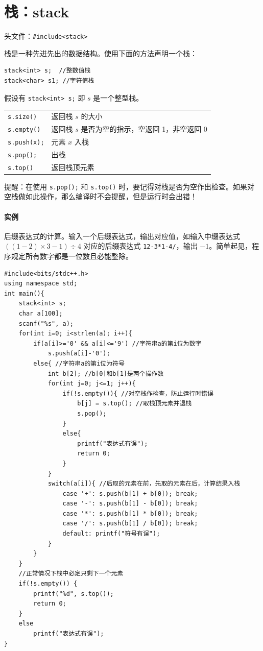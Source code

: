 \documentclass[UTF8]{ctexart}
\newcommand\Emph[1]{\colorbox{green!10}{\textcolor{green!30!black}{#1}}}
\begin{document}
\section{栈：stack}
头文件：\verb!#include<stack>!

栈是一种先进先出的数据结构。使用下面的方法声明一个栈：
\begin{lstlisting}[numbers=none]
stack<int> s;  //整数值栈
stack<char> s1; //字符值栈
\end{lstlisting}

假设有 \verb!stack<int> s;! 即 $s$ 是一个整型栈。 
\begin{table}[H]
  \centering
  \begin{tabular}{ll}
    \verb!s.size()! & 返回栈 $s$ 的大小 \\
    \verb!s.empty()! & 返回栈 $s$ 是否为空的指示，空返回 1，非空返回 0 \\
    \verb!s.push(x);! & 元素 $x$ 入栈 \\
    \verb!s.pop();! & 出栈 \\
    \verb!s.top()! & 返回栈顶元素 \\
  \end{tabular}
\end{table}

提醒：在使用 \verb!s.pop();! 和 \verb!s.top()! 时，要记得\Emph{对栈是否为空作出检查}。如果对空栈做如此操作，那么编译时不会提醒，但是运行时会出错！

\paragraph{实例} 后缀表达式的计算。输入一个后缀表达式，输出对应值，如输入中缀表达式 $((1-2)\times 3-1)\div 4$ 对应的后缀表达式 \verb!12-3*1-4/!，输出 $-1$。简单起见，程序规定所有数字都是一位数且必能整除。

\begin{lstlisting}
#include<bits/stdc++.h>
using namespace std;
int main(){
	stack<int> s;
	char a[100];
	scanf("%s", a);
	for(int i=0; i<strlen(a); i++){
		if(a[i]>='0' && a[i]<='9') //字符串a的第i位为数字
			s.push(a[i]-'0');
		else{ //字符串a的第i位为符号
			int b[2]; //b[0]和b[1]是两个操作数
			for(int j=0; j<=1; j++){
				if(!s.empty()){ //对空栈作检查，防止运行时错误
					b[j] = s.top(); //取栈顶元素并退栈
					s.pop();
				}
				else{
					printf("表达式有误");
					return 0;
				}
			}
			switch(a[i]){ //后取的元素在前，先取的元素在后，计算结果入栈
				case '+': s.push(b[1] + b[0]); break;
				case '-': s.push(b[1] - b[0]); break;
				case '*': s.push(b[1] * b[0]); break;
				case '/': s.push(b[1] / b[0]); break;
				default: printf("符号有误");
			}
		}
	}
	//正常情况下栈中必定只剩下一个元素
	if(!s.empty()) {
		printf("%d", s.top());
		return 0;
	}
	else
		printf("表达式有误");
}
\end{lstlisting}
\end{document}
